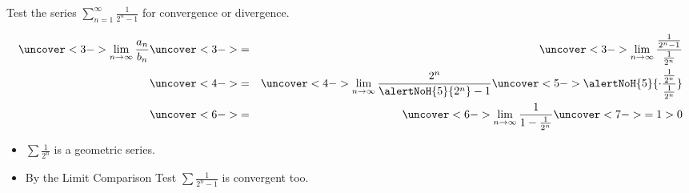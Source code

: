 \begin{frame}
\begin{example}[Example 3, p. 743]
Test the series $\sum_{n=1}^\infty \frac{1}{2^n-1}$ for convergence or divergence.

%
\abovedisplayskip=0pt
\belowdisplayskip=0pt
\begin{eqnarray*}
\uncover<3->{%
\lim_{n\to\infty} \frac{a_n}{b_n}%
}%
& \uncover<3->{ = } &%
\uncover<3->{%
\lim_{n\to\infty} \frac{\frac{1}{2^n-1}}{\frac{1}{2^n}}%
}\\%
& \uncover<4->{ = } &%
\uncover<4->{%
\lim_{n\to\infty} \frac{2^n}{\alertNoH{ 5}{2^n}-1}\uncover<5->{\alertNoH{ 5}{\cdot \frac{\frac{1}{2^n}}{\frac{1}{2^n}}}}%
}\\%
& \uncover<6->{ = } &%
\uncover<6->{%
\lim_{n\to\infty} \frac{1}{1-\frac{1}{2^n}}%
}%
\uncover<7->{%
 = 1 > 0%
}%
\end{eqnarray*}
\begin{itemize}
\item<8-| alert@8-9>  $\sum \frac{1}{2^n}$ is a  geometric series.
\item<10->  By the Limit Comparison Test $\sum \frac{1}{2^n-1}$ is convergent too.%
\end{itemize}
\end{example}
\end{frame}
